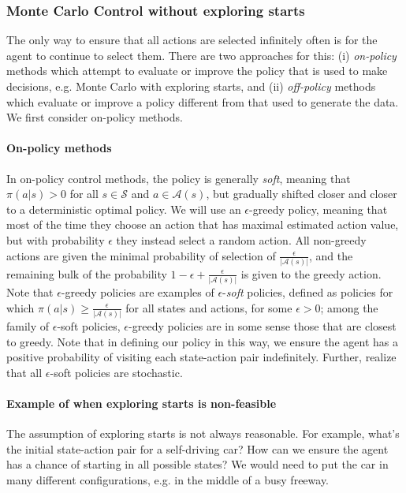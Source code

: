 \documentclass[12pt]{article}
\begin{document}
\subsubsection{Monte Carlo Control without exploring starts}
The only way to ensure that all actions are selected infinitely often is for the agent to continue to select them. There are two approaches for this: (i) \emph{on-policy} methods which attempt to evaluate or improve the policy that is used to make decisions, e.g. Monte Carlo with exploring starts, and (ii) \emph{off-policy} methods which evaluate or improve a policy different from that used to generate the data. We first consider on-policy methods.

\paragraph{On-policy methods} In on-policy control methods, the policy is generally \emph{soft}, meaning that $\pi(a|s) > 0$ for all $s \in \mathcal S$ and $a \in \mathcal A(s)$, but gradually shifted closer and closer to a deterministic optimal policy. We will use an $\epsilon$-greedy policy, meaning that most of the time they choose an action that has maximal estimated action value, but with probability $\epsilon$ they instead select a random action. All non-greedy actions are given the minimal probability of selection of $\frac{\epsilon}{|\mathcal A(s)|}$, and the remaining bulk of the probability $1 - \epsilon + \frac{\epsilon}{|\mathcal A(s)|}$ is given to the greedy action. Note that $\epsilon$-greedy policies are examples of $\epsilon$-\emph{soft} policies, defined as policies for which $\pi(a|s) \geq \frac{\epsilon}{|\mathcal A(s)|}$ for all states and actions, for some $\epsilon > 0$; among the family of $\epsilon$-soft policies, $\epsilon$-greedy policies are in some sense those that are closest to greedy. Note that in defining our policy in this way, we ensure the agent has a positive probability of visiting each state-action pair indefinitely. Further, realize that all $\epsilon$-soft policies are stochastic.

\paragraph{Example of when exploring starts is non-feasible} The assumption of exploring starts is not always reasonable. For example, what's the initial state-action pair for a self-driving car? How can we ensure the agent has a chance of starting in all possible states? We would need to put the car in many different configurations, e.g. in the middle of a busy freeway.
\end{document}
